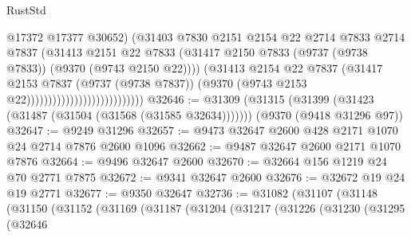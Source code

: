 \begin{lexlean}{RustStd}
\begin{coremodule}
                                                  @17372
                                                  @17377
                                                  @30652)
                                                (@31403
                                                  @7830
                                                  @2151
                                                  @2154
                                                  @22
                                                  @2714
                                                  @7833
                                                  @2714
                                                  @7837
                                                  (@31413
                                                    @2151
                                                    @22
                                                    @7833
                                                    (@31417
                                                      @2150
                                                      @7833
                                                      (@9737 (@9738 @7833))
                                                      (@9370 (@9743 @2150 @22))))
                                                  (@31413
                                                    @2154
                                                    @22
                                                    @7837
                                                    (@31417
                                                      @2153
                                                      @7837
                                                      (@9737 (@9738 @7837))
                                                      (@9370
                                                        (@9743 @2153 @22)))))))))))))))))))))))))))
@32646 := @31309
    (@31315 (@31399 (@31423 (@31487 (@31504 (@31568 (@31585 @32634)))))))
    (@9370 (@9418 @31296 @97))
@32647 := @9249 @31296
@32657 := @9473 @32647 @2600 @428 @2171 @1070 @24 @2714 @7876 @2600 @1096
@32662 := @9487 @32647 @2600 @2171 @1070 @7876
@32664 := @9496 @32647 @2600
@32670 := @32664 @156 @1219 @24 @70 @2771 @7875
@32672 := @9341 @32647 @2600
@32676 := @32672 @19 @24 @19 @2771
@32677 := @9350 @32647
@32736 := @31082
    (@31107
      (@31148
        (@31150
          (@31152
            (@31169
              (@31187
                (@31204
                  (@31217
                    (@31226
                      (@31230
                        (@31295
                          (@32646

\end{coremodule}
\end{lexlean}

